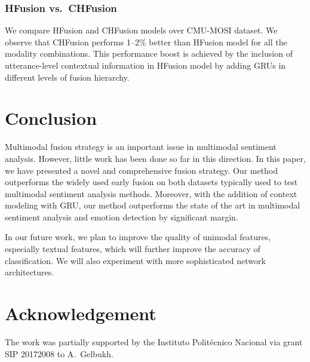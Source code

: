 \documentclass[review]{elsarticle}
\newcommand\?[1]{\hl{#1}}
\begin{document}
\subsubsection{HFusion vs.\ CHFusion}

We compare HFusion and CHFusion models over CMU-MOSI dataset. We observe that
CHFusion performs 1--2\% better than HFusion model for all the modality
combinations. This performance boost is achieved by the inclusion of
utterance-level contextual information in HFusion model by adding GRUs in
different levels of fusion hierarchy.

\section{Conclusion}
\label{sec:conclusions}
Multimodal fusion strategy is an important issue in multimodal sentiment analysis. 
However, little work has been done so far in this direction. 
In this paper, we have presented a novel and comprehensive fusion strategy. 
Our method outperforms the widely used early fusion on both datasets typically used to test multimodal sentiment analysis methods.
Moreover, with the addition of context modeling with GRU, 
our method outperforms the state of the art in multimodal sentiment analysis and emotion detection by significant margin. 

In our future work, we plan to improve the quality of unimodal features, especially textual features, which will further improve the accuracy of classification.
We will also experiment with more sophisticated network architectures.

\section*{Acknowledgement}
The work was partially supported by the Instituto Polit\'ecnico Nacional via grant SIP 20172008 to A.~Gelbukh.



\end{document}
